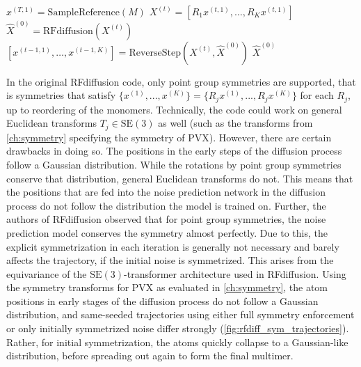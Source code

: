 \begin{algorithm}
    \caption{\textbf{Generation of symmetric oligomers} \\
    A faithful recreation of the symmetric diffusion sampling algorithm from the RFdiffusion supplement \cite{RFdiffusion}. Symmetry is enforced in RFdiffusion by overwriting the coordinates of the non-reference chains by applying the symmetry motions to the atom coordinates of the reference chain at the start of each iteration. }
    \begin{algorithmic}[1]
    \State $x^{(T,1)} = \text{SampleReference}(M)$
        \State $X^{(t)} = [R_1 x^{(t,1)}, \ldots, R_K x^{(t,1)}]$
        \State $\hat{X}^{(0)} = \text{RFdiffusion}(X^{(t)})$
        \State $[x^{(t-1,1)}, \ldots, x^{(t-1,K)}] = \text{ReverseStep}(X^{(t)}, \hat{X}^{(0)})$
    \EndFor
    \State \Return $\hat{X}^{(0)}$
    \end{algorithmic}
    \label{alg:rfdiff}
\end{algorithm}

In the original RFdiffusion code, only point group symmetries are supported, that is symmetries that satisfy $\{x^{(1)}, ..., x^{(K)}\} = \{R_j x^{(1)}, ..., R_j x^{(K)}\}$ for each $R_j$, up to reordering of the monomers. Technically, the code could work on general Euclidean transforms $T_j \in \mathrm{SE}(3)$ as well (such as the transforms from \autoref{ch:symmetry} specifying the symmetry of PVX). However, there are certain drawbacks in doing so. The positions in the early steps of the diffusion process follow a Gaussian distribution. While the rotations by point group symmetries conserve that distribution, general Euclidean transforms do not. This means that the positions that are fed into the noise prediction network in the diffusion process do not follow the distribution the model is trained on. Further, the authors of RFdiffusion observed that for point group symmetries, the noise prediction model conserves the symmetry almost perfectly. Due to this, the explicit symmetrization in each iteration is generally not necessary and barely affects the trajectory, if the initial noise is symmetrized. This arises from the equivariance of the $\mathrm{SE}(3)$-transformer architecture used in RFdiffusion. Using the symmetry transforms for PVX as evaluated in \autoref{ch:symmetry}, the atom positions in early stages of the diffusion process do not follow a Gaussian distribution, and same-seeded trajectories using either full symmetry enforcement or only initially symmetrized noise differ strongly (\autoref{fig:rfdiff_sym_trajectories}). Rather, for initial symmetrization, the atoms quickly collapse to a Gaussian-like distribution, before spreading out again to form the final multimer.

